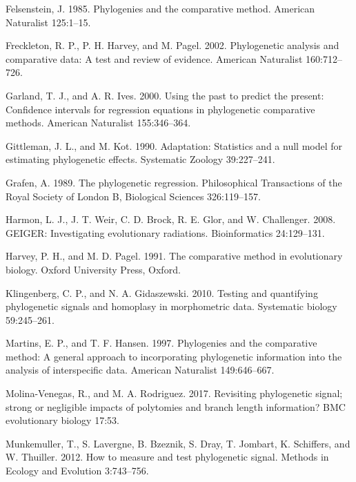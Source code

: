 \documentclass[
]{article}
\begin{document}
\leavevmode\hypertarget{ref-Felsenstein1985}{}%
Felsenstein, J. 1985. Phylogenies and the comparative method. American
Naturalist 125:1--15.

\leavevmode\hypertarget{ref-Freckleton_et_al2002}{}%
Freckleton, R. P., P. H. Harvey, and M. Pagel. 2002. Phylogenetic
analysis and comparative data: A test and review of evidence. American
Naturalist 160:712--726.

\leavevmode\hypertarget{ref-GarlandIves2000}{}%
Garland, T. J., and A. R. Ives. 2000. Using the past to predict the
present: Confidence intervals for regression equations in phylogenetic
comparative methods. American Naturalist 155:346--364.

\leavevmode\hypertarget{ref-Gittleman1990}{}%
Gittleman, J. L., and M. Kot. 1990. Adaptation: Statistics and a null
model for estimating phylogenetic effects. Systematic Zoology
39:227--241.

\leavevmode\hypertarget{ref-Grafen1989}{}%
Grafen, A. 1989. The phylogenetic regression. Philosophical Transactions
of the Royal Society of London B, Biological Sciences 326:119--157.

\leavevmode\hypertarget{ref-Harmon2008}{}%
Harmon, L. J., J. T. Weir, C. D. Brock, R. E. Glor, and W. Challenger.
2008. GEIGER: Investigating evolutionary radiations. Bioinformatics
24:129--131.

\leavevmode\hypertarget{ref-HarveyPagel1991}{}%
Harvey, P. H., and M. D. Pagel. 1991. The comparative method in
evolutionary biology. Oxford University Press, Oxford.

\leavevmode\hypertarget{ref-Klingenberg2010}{}%
Klingenberg, C. P., and N. A. Gidaszewski. 2010. Testing and quantifying
phylogenetic signals and homoplasy in morphometric data. Systematic
biology 59:245--261.

\leavevmode\hypertarget{ref-MartinsHansen1997}{}%
Martins, E. P., and T. F. Hansen. 1997. Phylogenies and the comparative
method: A general approach to incorporating phylogenetic information
into the analysis of interspecific data. American Naturalist
149:646--667.

\leavevmode\hypertarget{ref-MolinaVenegas2017}{}%
Molina-Venegas, R., and M. A. Rodriguez. 2017. Revisiting phylogenetic
signal; strong or negligible impacts of polytomies and branch length
information? BMC evolutionary biology 17:53.

\leavevmode\hypertarget{ref-Munkemuller_et_al2012}{}%
Munkemuller, T., S. Lavergne, B. Bzeznik, S. Dray, T. Jombart, K.
Schiffers, and W. Thuiller. 2012. How to measure and test phylogenetic
signal. Methods in Ecology and Evolution 3:743--756.
\end{document}
